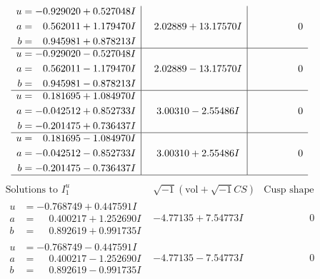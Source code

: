 \documentclass[1p]{elsarticle_modified}
\theoremstyle{definition}
\newcommand{\I}{\sqrt{-1}}
\begin{document}
$$\begin{array}{c|c|c}
\begin{aligned}
u &= -0.929020 + 0.527048 I \\
a &= \phantom{-}0.562011 + 1.179470 I \\
b &= \phantom{-}0.945981 + 0.878213 I\end{aligned}
 & \phantom{-}2.02889 + 13.17570 I & \phantom{-0.000000 } 0 \\ \hline\begin{aligned}
u &= -0.929020 - 0.527048 I \\
a &= \phantom{-}0.562011 - 1.179470 I \\
b &= \phantom{-}0.945981 - 0.878213 I\end{aligned}
 & \phantom{-}2.02889 - 13.17570 I & \phantom{-0.000000 } 0 \\ \hline\begin{aligned}
u &= \phantom{-}0.181695 + 1.084970 I \\
a &= -0.042512 + 0.852733 I \\
b &= -0.201475 + 0.736437 I\end{aligned}
 & \phantom{-}3.00310 - 2.55486 I & \phantom{-0.000000 } 0 \\ \hline\begin{aligned}
u &= \phantom{-}0.181695 - 1.084970 I \\
a &= -0.042512 - 0.852733 I \\
b &= -0.201475 - 0.736437 I\end{aligned}
 & \phantom{-}3.00310 + 2.55486 I & \phantom{-0.000000 } 0\\
 \hline 
 \end{array}$$\newpage$$\begin{array}{c|c|c}  
\text{Solutions to }I^u_{1}& \I (\text{vol} + \sqrt{-1}CS) & \text{Cusp shape}\\
 \hline 
\begin{aligned}
u &= -0.768749 + 0.447591 I \\
a &= \phantom{-}0.400217 + 1.252690 I \\
b &= \phantom{-}0.892619 + 0.991735 I\end{aligned}
 & -4.77135 + 7.54773 I & \phantom{-0.000000 } 0 \\ \hline\begin{aligned}
u &= -0.768749 - 0.447591 I \\
a &= \phantom{-}0.400217 - 1.252690 I \\
b &= \phantom{-}0.892619 - 0.991735 I\end{aligned}
 & -4.77135 - 7.54773 I & \phantom{-0.000000 } 0 \\ \hline\begin{aligned}

\end{aligned}
\end{array}$$
\end{document}
